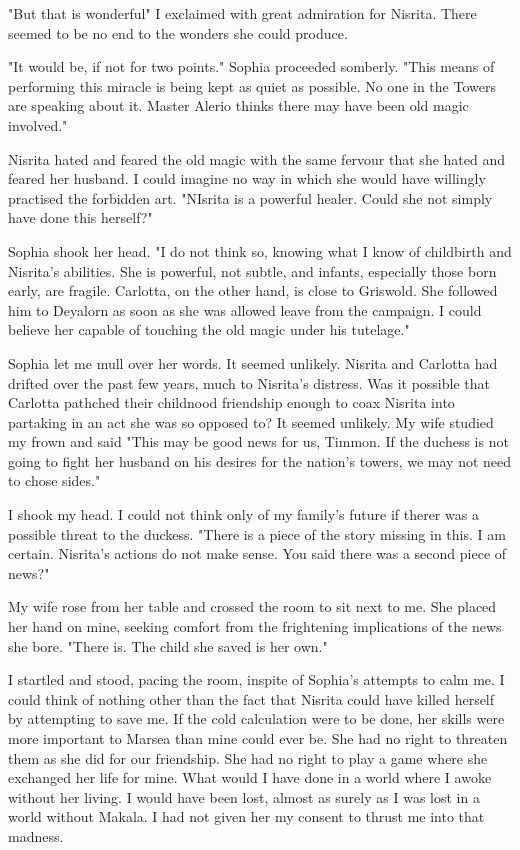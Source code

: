 \documentclass{article}
\begin{document}
"But that is wonderful" I exclaimed with great admiration for Nisrita. There seemed to be no end to the wonders she could produce.

"It would be, if not for two points." Sophia proceeded somberly. "This means of performing this miracle is being kept as quiet as possible. No one in the Towers are speaking about it. Master Alerio thinks there may have been old magic involved."

Nisrita hated and feared the old magic with the same fervour that she hated and feared her husband. I could imagine no way in which she would have willingly practised the forbidden art. "NIsrita is a powerful healer. Could she not simply have done this herself?" 

Sophia shook her head. "I do not think so, knowing what I know of childbirth and Nisrita's abilities. She is powerful, not subtle, and infants, especially those born early, are fragile. Carlotta, on the other hand, is close to Griswold. She followed him to Deyalorn as soon as she was allowed leave from the campaign. I could believe her capable of touching the old magic under his tutelage."

Sophia let me mull over her words. It seemed unlikely. Nisrita and Carlotta had drifted over the past few years, much to Nisrita's distress. Was it possible that Carlotta pathched their childnood friendship enough to coax Nisrita into partaking in an act she was so opposed to? It seemed unlikely. My wife studied my frown and said "This may be good news for us, Timmon. If the duchess is not going to fight her husband on his desires for the nation's towers, we may not need to chose sides."

I shook my head. I could not think only of my family's future if therer was a possible threat to the duckess. "There is a piece of the story missing in this. I am certain. Nisrita's actions do not make sense. You said there was a second piece of news?"

My wife rose from her table and crossed the room to sit next to me. She placed her hand on mine, seeking comfort from the frightening implications of the news she bore. "There is. The child she saved is her own."

I startled and stood, pacing the room, inspite of Sophia's attempts to calm me. I could think of nothing other than the fact that Nisrita could have killed herself by attempting to save me. If the cold calculation were to be done, her skills were more important to Marsea than mine could ever be. She had no right to threaten them as she did for our friendship. She had no right to play a game where she exchanged her life for mine. What would I have done in a world where I awoke without her living. I would have been lost, almost as surely as I was lost in a world without Makala. I had not given her my consent to thrust me into that madness.
\end{document}

